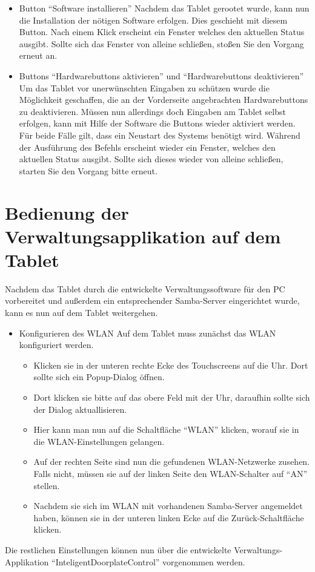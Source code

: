 \begin{flushleft}
\begin{itemize}
  \item Button ``Software installieren''
    \subitem Nachdem das Tablet gerootet wurde, kann nun die Installation der nötigen Software erfolgen. Dies geschieht mit diesem Button. 	
	     Nach einem Klick erscheint ein Fenster welches den aktuellen Status ausgibt. Sollte sich das Fenster von alleine schließen, stoßen Sie den Vorgang erneut an. 
	 
  \item Buttons ``Hardwarebuttons aktivieren'' und ``Hardwarebuttons deaktivieren''
    \subitem Um das Tablet vor unerwünschten Eingaben zu schützen wurde die Möglichkeit geschaffen, die an der Vorderseite angebrachten 	
             Hardwarebuttons zu deaktivieren. Müssen nun allerdings doch Eingaben am Tablet selbst erfolgen, kann mit Hilfe der Software die Buttons wieder aktiviert werden. Für beide Fälle gilt, dass ein Neustart des Systems benötigt wird. Während der Ausführung des Befehls erscheint wieder ein Fenster, welches den aktuellen Status ausgibt. Sollte sich dieses wieder von alleine schließen, starten Sie den Vorgang bitte erneut.
\end{itemize}


\section{Bedienung der Verwaltungsapplikation auf dem Tablet}
  Nachdem das Tablet durch die entwickelte Verwaltungssoftware für den PC vorbereitet und außerdem ein entsprechender Samba-Server eingerichtet wurde, kann es nun auf dem Tablet weitergehen.
  \begin{itemize}
  \item{Konfigurieren des WLAN}
    Auf dem Tablet muss zunächst das WLAN konfiguriert werden.
    \begin{itemize}
      \item Klicken sie in der unteren rechte Ecke des Touchscreens auf die Uhr. Dort sollte sich ein Popup-Dialog öffnen.
      \item Dort klicken sie bitte auf das obere Feld mit der Uhr, daraufhin sollte sich der Dialog aktuallisieren.
      \item Hier kann man nun auf die Schaltfläche ``WLAN'' klicken, worauf sie in die WLAN-Einstellungen gelangen.
      \item Auf der rechten Seite sind nun die gefundenen WLAN-Netzwerke zusehen. Falls nicht, müssen sie auf der linken Seite den WLAN-Schalter auf ``AN'' stellen.
      \item Nachdem sie sich im WLAN mit vorhandenen Samba-Server angemeldet haben, können sie in der unteren linken Ecke auf die Zurück-Schaltfläche klicken.
    \end{itemize}
  \end{itemize}
  Die restlichen Einstellungen können nun über die entwickelte Verwaltungs-Applikation ``InteligentDoorplateControl'' vorgenommen werden.

\end{flushleft}
